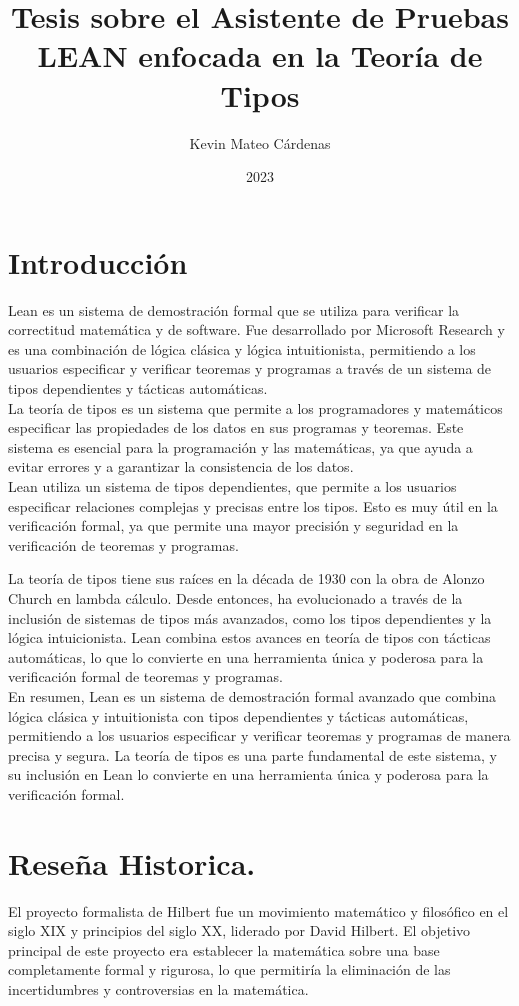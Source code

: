 \documentclass{article}
\title{Tesis sobre el Asistente de Pruebas LEAN enfocada en la Teoría de Tipos}
\author{Kevin Mateo Cárdenas}
\date{2023}
\begin{document}
\maketitle

\section{Introducción}
Lean es un sistema de demostración formal que se utiliza para verificar la correctitud
matemática y de software. Fue desarrollado por Microsoft Research y es una combinación
de lógica clásica y lógica intuitionista, permitiendo a los usuarios especificar y
verificar teoremas y programas a través de un sistema de tipos dependientes y tácticas
automáticas.\\

La teoría de tipos es un sistema que permite a los programadores y matemáticos
especificar las propiedades de los datos en sus programas y teoremas. Este sistema es
esencial para la programación y las matemáticas, ya que ayuda a evitar errores y a
garantizar la consistencia de los datos.\\

Lean utiliza un sistema de tipos dependientes, que permite a los usuarios especificar
relaciones complejas y precisas entre los tipos. Esto es muy útil en la verificación
formal, ya que permite una mayor precisión y seguridad en la verificación de teoremas
y programas.

La teoría de tipos tiene sus raíces en la década de 1930 con la obra de Alonzo Church
en lambda cálculo. Desde entonces, ha evolucionado a través de la inclusión de sistemas
de tipos más avanzados, como los tipos dependientes y la lógica intuicionista. Lean
combina estos avances en teoría de tipos con tácticas automáticas, lo que lo convierte
en una herramienta única y poderosa para la verificación formal de teoremas y
programas.\\

En resumen, Lean es un sistema de demostración formal avanzado que combina lógica
clásica y intuitionista con tipos dependientes y tácticas automáticas, permitiendo a
los usuarios especificar y verificar teoremas y programas de manera precisa y segura.
La teoría de tipos es una parte fundamental de este sistema, y su inclusión en Lean lo
convierte en una herramienta única y poderosa para la verificación formal.\\

\section{Reseña Historica.}
El proyecto formalista de Hilbert fue un movimiento matemático y filosófico en el siglo XIX y principios del siglo XX, liderado por David Hilbert. El objetivo principal de este proyecto era establecer la matemática sobre una base completamente formal y rigurosa, lo que permitiría la eliminación de las incertidumbres y controversias en la matemática.\\
\end{document}
